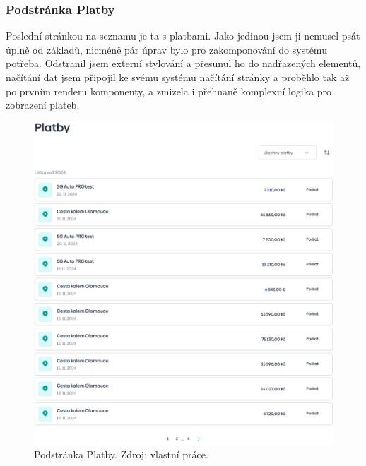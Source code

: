 \newpage
\subsubsection{Podstránka Platby}
Poslední stránkou na seznamu je ta s platbami. Jako jedinou jsem ji nemusel psát úplně od základů, nicméně pár úprav bylo pro zakomponování do systému potřeba. Odstranil jsem externí stylování a přesunul ho do nadřazených elementů, načítání dat jsem připojil ke svému systému načítání stránky a proběhlo tak až po prvním renderu komponenty, a zmizela i přehnaně komplexní logika pro zobrazení plateb.
\\
\begin{figure}[!h]
    \centering
    \includegraphics[width=0.9\linewidth]{obrazky/platby.png}
    \caption{Podstránka Platby. Zdroj: vlastní práce.}
\end{figure}